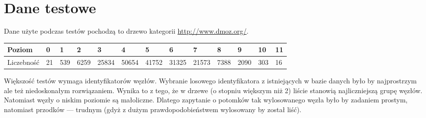 


% 



\section{Dane testowe}


Dane użyte podczas testów pochodzą to drzewo kategorii \url{http://www.dmoz.org/}.


\begin{tabular}{|l|l@{ }l@{ }l@{ }l@{ }l@{ }l@{ }l@{ }l@{ }l@{ }l@{ }l@{ }l@{ }|}
\hline
Poziom     & 0      & 1     & 2     & 3     & 4     & 5     & 6     & 7     & 8     & 9     & 10    & 11 \\
\hline
Liczebność & 21     & 539   & 6259  & 25834 & 50654 & 41752 & 31325 & 21573 & 7388  & 2090  & 303   & 16 \\
\hline
\end{tabular}


Większość testów wymaga identyfikatorów węzłów. 
Wybranie losowego identyfikatora z istniejących w bazie danych było by najprostrzym 
ale też niedoskonałym  rozwiązaniem.
Wynika to z tego, że w drzewe (o stopniu większym niż 2) 
liście stanowią najliczniejszą grupę węzłów.
Natomiast węzły o niskim poziomie są małoliczne.
Dlatego zapytanie o potomków tak wylosowanego węzła było by zadaniem prostym, natomiast przodków --- trudnym (gdyż z dużym prawdopodobieństwem wylosowany by został liść).

